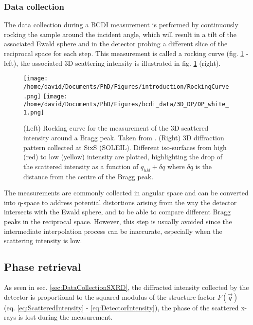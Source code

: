 \subsubsection{Data collection} \label{sec:DataCollectionBCDI}

The data collection during a BCDI measurement is performed by continuously rocking the sample around the incident angle, which will result in a tilt of the associated Ewald sphere and in the detector probing a different slice of the reciprocal space for each step.
This measurement is called a rocking curve (fig. \ref{fig:3DDP} - left), the associated 3D scattering intensity is illustrated in fig. \ref{fig:3DDP} (right).

\begin{figure}[!htb]
    \centering
    \texttt{[image: /home/david/Documents/PhD/Figures/introduction/RockingCurve.png]}
    \texttt{[image: /home/david/Documents/PhD/Figures/bcdi\_data/3D\_DP/DP\_white\_1.png]}
    \caption{
    (Left) Rocking curve for the measurement of the 3D scattered intensity around a Bragg peak. Taken from \cite{Willmott}.
    (Right) 3D diffraction pattern collected at SixS (SOLEIL).
    Different iso-surfaces from high (red) to low (yellow) intensity are plotted, highlighting the drop of the scattered intensity as a function of $q_{hkl}+\delta q$ where $\delta q$ is the distance from the centre of the Bragg peak.
    }
    \label{fig:3DDP}
\end{figure}

The measurements are commonly collected in angular space and can be converted into q-space to address potential distortions arising from the way the detector intersects with the Ewald sphere, and to be able to compare different Bragg peaks in the reciprocal space.
However, this step is usually avoided since the intermediate interpolation process can be inaccurate, especially when the scattering intensity is low.

\subsection{Phase retrieval}\label{sec:PhaseRetrieval}

As seen in sec. \ref{sec:DataCollectionSXRD}, the diffracted intensity collected by the detector is proportional to the squared modulus of the structure factor $F(\vec{q})$ (eq. \ref{eq:ScatteredIntensity} - \ref{eq:DetectorIntensity}), the phase of the scattered x-rays is lost during the measurement.

